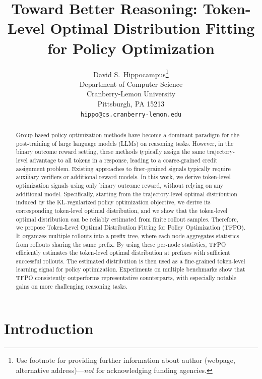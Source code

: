 \documentclass{article}
\title{Toward Better Reasoning: Token-Level Optimal Distribution Fitting for Policy Optimization}
\author{%
  David S.~Hippocampus\thanks{Use footnote for providing further information
    about author (webpage, alternative address)---\emph{not} for acknowledging
    funding agencies.} \\
  Department of Computer Science\\
  Cranberry-Lemon University\\
  Pittsburgh, PA 15213 \\
  \texttt{hippo@cs.cranberry-lemon.edu} \\
}
\begin{document}
\maketitle

\begin{abstract}
Group-based policy optimization methods have become a dominant paradigm for the post-training of large language models (LLMs) on reasoning tasks.
However, in the binary outcome reward setting, these methods typically assign the same trajectory-level advantage to all tokens in a response, leading to a coarse-grained credit assignment problem. 
Existing approaches to finer-grained signals typically require auxiliary verifiers or additional reward models.
In this work, we derive token-level optimization signals using only binary outcome reward, without relying on any additional model.
Specifically, starting from the trajectory-level optimal distribution induced by the KL-regularized policy optimization objective, we derive its corresponding token-level optimal distribution, and we show that the token-level optimal distribution can be reliably estimated from finite rollout samples.
Therefore, we propose Token-Level Optimal Distribution Fitting for Policy Optimization (TFPO).
It organizes multiple rollouts into a prefix tree, where each node aggregates statistics from rollouts sharing the same prefix. 
By using these per-node statistics, TFPO efficiently estimates the token-level optimal distribution at prefixes with sufficient successful rollouts.
The estimated distribution is then used as a fine-grained token-level learning signal for policy optimization.
Experiments on multiple benchmarks show that TFPO consistently outperforms representative counterparts, with especially notable gains on more challenging reasoning tasks.

\end{abstract}


\section{Introduction}
\end{document}
